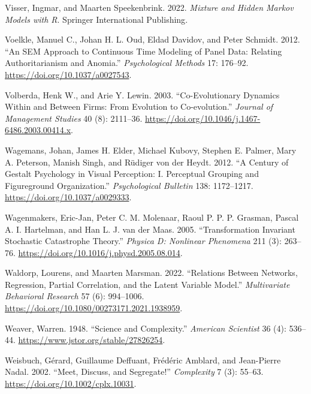 \documentclass[
  a4paper,
  DIV=11,
  numbers=noendperiod]{scrreprt}
\newlength{\cslhangindent}
\newlength{\cslentryspacingunit} %
\newenvironment{CSLReferences}[2] %
 {%
  \setlength{\parindent}{0pt}
  \ifodd #1
  \let\oldpar\par
  \def\par{\hangindent=\cslhangindent\oldpar}
  \fi
  \setlength{\parskip}{#2\cslentryspacingunit}
 }%
 {}
\begin{document}
\begin{CSLReferences}{1}{0}
\leavevmode{}%
Visser, Ingmar, and Maarten Speekenbrink. 2022. \emph{Mixture and
{Hidden Markov Models} with {R}}. {Springer International Publishing}.

\leavevmode{}%
Voelkle, Manuel C., Johan H. L. Oud, Eldad Davidov, and Peter Schmidt.
2012. {``An {SEM} Approach to Continuous Time Modeling of Panel Data:
{Relating} Authoritarianism and Anomia.''} \emph{Psychological Methods}
17: 176--92. \url{https://doi.org/10.1037/a0027543}.

\leavevmode{}%
Volberda, Henk W., and Arie Y. Lewin. 2003. {``Co-Evolutionary {Dynamics
Within} and {Between Firms}: {From Evolution} to {Co-evolution}.''}
\emph{Journal of Management Studies} 40 (8): 2111--36.
\url{https://doi.org/10.1046/j.1467-6486.2003.00414.x}.

\leavevmode{}%
Wagemans, Johan, James H. Elder, Michael Kubovy, Stephen E. Palmer, Mary
A. Peterson, Manish Singh, and Rüdiger von der Heydt. 2012. {``A Century
of {Gestalt} Psychology in Visual Perception: {I}. {Perceptual} Grouping
and Figure\textendash ground Organization.''} \emph{Psychological
Bulletin} 138: 1172--1217. \url{https://doi.org/10.1037/a0029333}.

\leavevmode{}%
Wagenmakers, Eric-Jan, Peter C. M. Molenaar, Raoul P. P. P. Grasman,
Pascal A. I. Hartelman, and Han L. J. van der Maas. 2005.
{``Transformation Invariant Stochastic Catastrophe Theory.''}
\emph{Physica D: Nonlinear Phenomena} 211 (3): 263--76.
\url{https://doi.org/10.1016/j.physd.2005.08.014}.

\leavevmode{}%
Waldorp, Lourens, and Maarten Marsman. 2022. {``Relations Between
{Networks}, {Regression}, {Partial Correlation}, and the {Latent
Variable Model}.''} \emph{Multivariate Behavioral Research} 57 (6):
994--1006. \url{https://doi.org/10.1080/00273171.2021.1938959}.

\leavevmode{}%
Weaver, Warren. 1948. {``Science and {Complexity}.''} \emph{American
Scientist} 36 (4): 536--44. \url{https://www.jstor.org/stable/27826254}.

\leavevmode{}%
Weisbuch, Gérard, Guillaume Deffuant, Frédéric Amblard, and Jean-Pierre
Nadal. 2002. {``Meet, Discuss, and Segregate!''} \emph{Complexity} 7
(3): 55--63. \url{https://doi.org/10.1002/cplx.10031}.


\end{CSLReferences}
\end{document}
